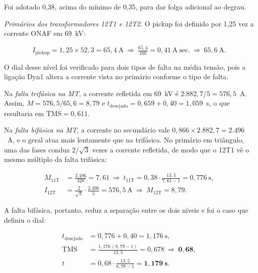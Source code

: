 Foi adotado 0,38, acima do mínimo de 0,35, para dar folga adicional ao degrau.

\textit{Primários dos transformadores 12T1 e 12T2.} O pickup foi definido por 1,25 vez a corrente ONAF em 69~kV:

\begin{equation}
    I_{\mathrm{pickup}}=1{,}25\times52{,}3=65{,}4~\mathrm{A}
    \ \Rightarrow\ \tfrac{65{,}4}{160}=0{,}41~\mathrm{A~sec.}
    \ \Rightarrow\ 65{,}6~\mathrm{A}.
    \label{eq:oc_51_at_pickup}
\end{equation}

O dial desse nível foi verificado para dois tipos de falta na média tensão, pois a ligação Dyn1 altera a corrente vista no primário conforme o tipo de falta.

Na \emph{falta trifásica na MT}, a corrente refletida em 69~kV é $2.882{,}7/5=576{,}5$~A. Assim, $M=576{,}5/65{,}6=8{,}79$ e $t_{\mathrm{desejado}}=0{,}659+0{,}40=1{,}059$~s, o que resultaria em $\mathrm{TMS}=0{,}611$.

Na \emph{falta bifásica na MT}, a corrente no secundário vale $0{,}866\times2.882{,}7=2.496$~A, e o geral atua mais lentamente que na trifásica. No primário em triângulo, uma das fases conduz $2/\sqrt{3}$ vezes a corrente refletida, de modo que o 12T1 vê o mesmo múltiplo da falta trifásica:

\begin{equation}
    \begin{aligned}
        M_{\mathrm{11T}}&=\frac{2.496}{328}=7{,}61
            \ \Rightarrow\ t_{\mathrm{11T}}=0{,}38\cdot\frac{13{,}5}{7{,}61-1}=0{,}776~\mathrm{s},\\
        I_{\mathrm{12T}}&=\frac{2}{\sqrt{3}}\cdot\frac{2.496}{5}=576{,}5~\mathrm{A}
            \ \Rightarrow\ M_{\mathrm{12T}}=8{,}79.
    \end{aligned}
    \label{eq:oc_bifasica_dyn}
\end{equation}

A falta bifásica, portanto, reduz a separação entre os dois níveis e foi o caso que definiu o dial:

\begin{equation}
    \begin{aligned}
        t_{\mathrm{desejado}}&=0{,}776+0{,}40=1{,}176~\mathrm{s},\\
        \mathrm{TMS}&=\frac{1{,}176\,(8{,}79-1)}{13{,}5}=0{,}678
            \ \Rightarrow\ \mathbf{0{,}68},\\
        t&=0{,}68\cdot\frac{13{,}5}{8{,}79-1}=\mathbf{1{,}179~s}.
    \end{aligned}
    \label{eq:oc_51_at}
\end{equation}

